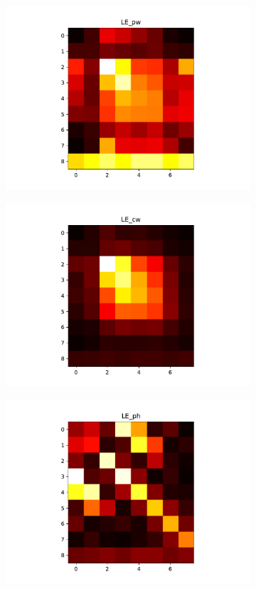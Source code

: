 \begin{figure}[H]
\begin{subfigure}{0.48\textwidth}
\includegraphics[width = \textwidth]{../fig/heatmap_LE_pw.pdf}
\end{subfigure}
\begin{subfigure}{0.48\textwidth}
\includegraphics[width = \textwidth]{../fig/heatmap_LE_cw.pdf}
\end{subfigure}
\begin{subfigure}{0.48\textwidth}
\includegraphics[width = \textwidth]{../fig/heatmap_LE_ph.pdf}

\end{subfigure}
\end{figure}
